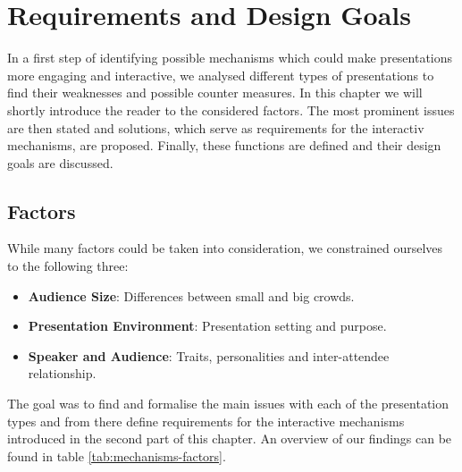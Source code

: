 \chapter{Requirements and Design Goals}
\label{cha:mechanisms}

In a first step of identifying possible mechanisms which could make presentations more engaging and interactive, we analysed different types of presentations to find their weaknesses and possible counter measures. In this chapter we will shortly introduce the reader to the considered factors. The most prominent issues are then stated and solutions, which serve as requirements for the interactiv mechanisms, are proposed. Finally, these functions are defined and their design goals are discussed.

\section{Factors}

While many factors could be taken into consideration, we constrained ourselves to the following three:
\begin{itemize}
\item\textbf{Audience Size}: Differences between small and big crowds.
\item\textbf{Presentation Environment}: Presentation setting and purpose.
\item\textbf{Speaker and Audience}: Traits, personalities and inter-attendee relationship.
\end{itemize}
The goal was to find and formalise the main issues with each of the presentation types and from there define requirements for the interactive mechanisms introduced in the second part of this chapter. An overview of our findings can be found in table \ref{tab:mechanisms-factors}.

